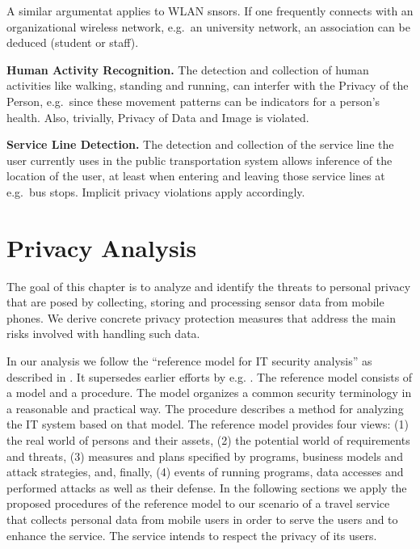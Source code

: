 \documentclass[runningheads,a4paper]{llncs}
\newenvironment{LGContent-Hidden}{ \comment  }{ }
\begin{document}
\begin{LGContent-Hidden}
A similar argumentat applies to WLAN snsors. If one frequently connects with an organizational wireless network, e.g.~an university network, an association can be deduced (student or staff).

\textbf{Human Activity Recognition.}
The detection and collection of human activities like walking, standing and running, can interfer with the Privacy of the Person, e.g.~since these movement patterns can be indicators for a person's health. Also, trivially, Privacy of Data and Image is violated.

\textbf{Service Line Detection.}
The detection and collection of the service line the user currently uses in the public transportation system allows inference of the location of the user, at least when entering and leaving those service lines at e.g.~bus stops.
Implicit privacy violations apply accordingly.

\end{LGContent-Hidden}









\section{Privacy Analysis}


The goal of this chapter is to analyze and identify the threats to personal privacy that are posed by collecting, storing and processing sensor data from mobile phones. We derive concrete privacy protection measures that address the main risks involved with handling such data.

In our analysis we follow the “reference model for IT security analysis” as described in \cite{Grimm:ItSecRefModel}. It supersedes earlier efforts by e.g. \cite{Avizienis}. The reference model consists of a model and a procedure. The model organizes a common security terminology in a reasonable and practical way. The procedure describes a method for analyzing the IT system based on that model. The reference model provides four views: (1) the real world of persons and their assets, (2) the potential world of requirements and threats, (3) measures and plans specified by programs, business models and attack strategies, and, finally, (4) events of running programs, data accesses and performed attacks as well as their defense. In the following sections we apply the proposed procedures of the reference model to our scenario of a travel service that collects personal data from mobile users in order to serve the users and to enhance the service. The service intends to respect the privacy of its users. 
\end{document}
